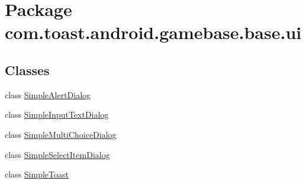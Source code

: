 \hypertarget{namespacecom_1_1toast_1_1android_1_1gamebase_1_1base_1_1ui}{}\section{Package com.\+toast.\+android.\+gamebase.\+base.\+ui}
\label{namespacecom_1_1toast_1_1android_1_1gamebase_1_1base_1_1ui}
\subsection*{Classes}
\begin{DoxyCompactItemize}
\item 
class \hyperlink{classcom_1_1toast_1_1android_1_1gamebase_1_1base_1_1ui_1_1_simple_alert_dialog}{Simple\+Alert\+Dialog}
\item 
class \hyperlink{classcom_1_1toast_1_1android_1_1gamebase_1_1base_1_1ui_1_1_simple_input_text_dialog}{Simple\+Input\+Text\+Dialog}
\item 
class \hyperlink{classcom_1_1toast_1_1android_1_1gamebase_1_1base_1_1ui_1_1_simple_multi_choice_dialog}{Simple\+Multi\+Choice\+Dialog}
\item 
class \hyperlink{classcom_1_1toast_1_1android_1_1gamebase_1_1base_1_1ui_1_1_simple_select_item_dialog}{Simple\+Select\+Item\+Dialog}
\item 
class \hyperlink{classcom_1_1toast_1_1android_1_1gamebase_1_1base_1_1ui_1_1_simple_toast}{Simple\+Toast}
\end{DoxyCompactItemize}
